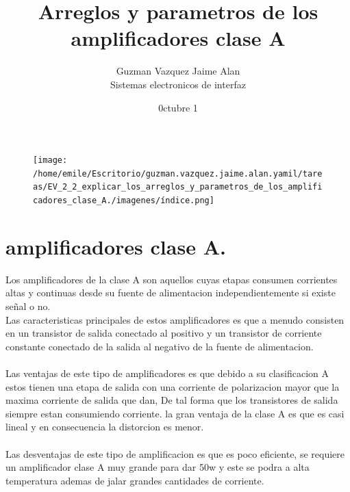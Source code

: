 \documentclass[12pt]{article}
\title{\textbf{Arreglos y parametros de los amplificadores clase A}}
\author{Guzman Vazquez Jaime Alan\\
Sistemas electronicos de interfaz}
\date{0ctubre 1}
\begin{document}
\begin{figure}[htp]
\centering
\texttt{[image: /home/emile/Escritorio/guzman.vazquez.jaime.alan.yamil/tareas/EV\_2\_2\_explicar\_los\_arreglos\_y\_parametros\_de\_los\_amplificadores\_clase\_A./imagenes/índice.png]}
\caption{}
\label{}
\end{figure}
\maketitle
\section{amplificadores clase A.}
Los amplificadores de la clase A son aquellos cuyas etapas consumen corrientes altas y continuas desde su fuente de alimentacion independientemente si existe señal o no.\\
Las caracteristicas principales de estos amplificadores es que a menudo consisten en un transistor de salida conectado al positivo y un transistor de corriente constante conectado de la salida al negativo de la fuente de alimentacion.\\\\
Las ventajas de este tipo de amplificadores  es que debido a su clasificacion A estos tienen una etapa de salida con una corriente  de polarizacion mayor que la maxima corriente de salida que dan, De tal forma que los transistores de salida siempre estan consumiendo corriente. la gran ventaja de la clase A es que es casi lineal y en consecuencia la distorcion es menor.\\\\
Las desventajas de este tipo de amplificacion es que es poco eficiente, se requiere un amplificador clase A muy grande para dar 50w y este se podra a alta temperatura ademas de jalar grandes cantidades de corriente.\\  
\end{document}
